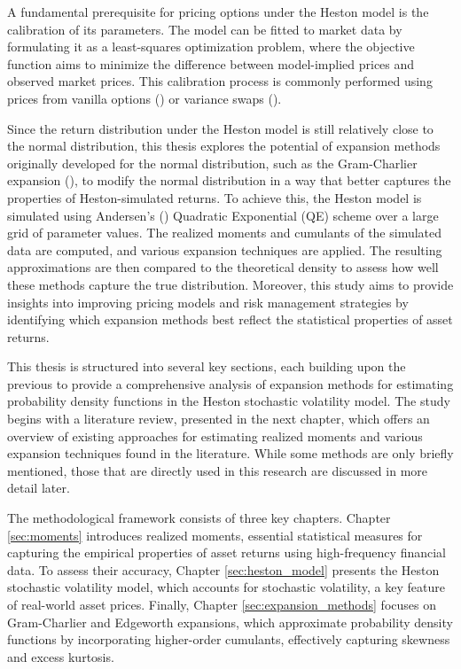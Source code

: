 A fundamental prerequisite for pricing options under the Heston model is the calibration of its parameters. The model can be fitted to market data by formulating it as a least-squares optimization problem, where the objective function aims to minimize the difference between model-implied prices and observed market prices. This calibration process is commonly performed using prices from vanilla options (\cite{flochAdaptiveFilonQuadrature2018}) or variance swaps (\cite{guillaumeHestonModelVariance2013}).

Since the return distribution under the Heston model is still relatively close to the normal distribution, this thesis explores the potential of expansion methods originally developed for the normal distribution, such as the Gram-Charlier expansion (\cite{gramUeberEntwickelungReeller1883,charlierContributionsMathematicalTheory1914}), to modify the normal distribution in a way that better captures the properties of Heston-simulated returns. To achieve this, the Heston model is simulated using Andersen's (\citeyear{andersenEfficientSimulationHeston2007}) Quadratic Exponential (QE) scheme over a large grid of parameter values. The realized moments and cumulants of the simulated data are computed, and various expansion techniques are applied. The resulting approximations are then compared to the theoretical density to assess how well these methods capture the true distribution. Moreover, this study aims to provide insights into improving pricing models and risk management strategies by identifying which expansion methods best reflect the statistical properties of asset returns.

This thesis is structured into several key sections, each building upon the previous to provide a comprehensive analysis of expansion methods for estimating probability density functions in the Heston stochastic volatility model. The study begins with a literature review, presented in the next chapter, which offers an overview of existing approaches for estimating realized moments and various expansion techniques found in the literature. While some methods are only briefly mentioned, those that are directly used in this research are discussed in more detail later.

The methodological framework consists of three key chapters. Chapter \ref{sec:moments} introduces realized moments, essential statistical measures for capturing the empirical properties of asset returns using high-frequency financial data. To assess their accuracy, Chapter \ref{sec:heston_model} presents the Heston stochastic volatility model, which accounts for stochastic volatility, a key feature of real-world asset prices. Finally, Chapter \ref{sec:expansion_methods} focuses on Gram-Charlier and Edgeworth expansions, which approximate probability density functions by incorporating higher-order cumulants, effectively capturing skewness and excess kurtosis.


